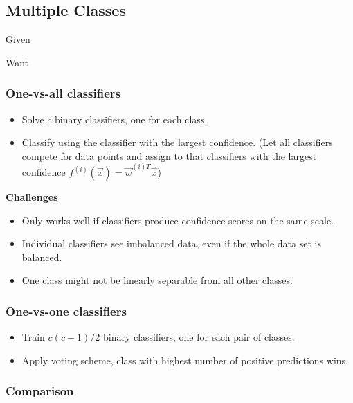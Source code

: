 \documentclass[10pt,a4paper]{scrartcl}
\begin{document}
\begin{multicols*}{2}
\subsection{Multiple Classes}

Given


Want


\subsubsection{One-vs-all classifiers}

\begin{itemize}
\item Solve $c$ binary classifiers, one for each class.
\item Classify using the classifier with the largest confidence. (Let all classifiers compete for data points and assign to that classifiers with the largest confidence $f^{(i)}(\vec{x})=\vec{w}^{(i)T}\vec{x}$)
\end{itemize}

\textbf{Challenges}
\begin{itemize}
\item Only works well if classifiers produce confidence scores on the same scale.
\item Individual classifiers see imbalanced data, even if the whole data set is balanced.
\item One class might not be linearly separable from all other classes.
\end{itemize}

\subsubsection{One-vs-one classifiers}

\begin{itemize}
\item Train $c(c-1)/2$ binary classifiers, one for each pair of classes.
\item Apply voting scheme, class with highest number of positive predictions wins.
\end{itemize}

\subsubsection{Comparison}


\end{multicols*}
\end{document}
